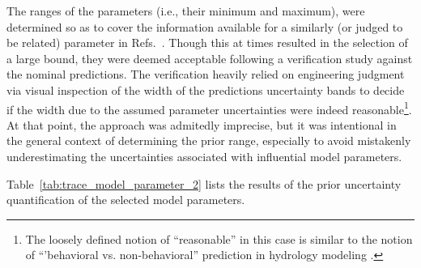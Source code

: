 The ranges of the parameters (i.e., their minimum and maximum), were determined so as to cover the information available for a similarly (or judged to be related) parameter in Refs.~\cite{Wickett1991,Glaeser2008a}.
Though this at times resulted in the selection of a large bound, they were deemed acceptable following a verification study against the nominal predictions.
The verification heavily relied on engineering judgment via visual inspection of the width of the predictions uncertainty bands to decide if the width due to the assumed parameter uncertainties were indeed reasonable\footnote{The loosely defined notion of ``reasonable'' in this case is similar to the notion of ``'behavioral vs. non-behavioral'' prediction in hydrology modeling \cite{Beven2009}.}.
At that point, the approach was admitedly imprecise, but it was intentional in the general context of determining the prior range, especially to avoid mistakenly underestimating the uncertainties associated with influential model parameters. 

%
Table~\ref{tab:trace_model_parameter_2} lists the results of the prior uncertainty quantification of the selected model parameters.
